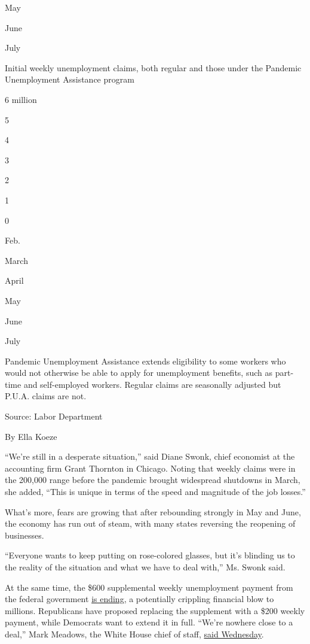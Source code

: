 May

June

July

Initial weekly unemployment claims, both regular and those under the
Pandemic Unemployment Assistance program

6 million

5

4

3

2

1

0

Feb.

March

April

May

June

July

Pandemic Unemployment Assistance extends eligibility to some workers who
would not otherwise be able to apply for unemployment benefits, such as
part-time and self-employed workers. Regular claims are seasonally
adjusted but P.U.A. claims are not.

Source: Labor Department

By Ella Koeze

``We're still in a desperate situation,'' said Diane Swonk, chief
economist at the accounting firm Grant Thornton in Chicago. Noting that
weekly claims were in the 200,000 range before the pandemic brought
widespread shutdowns in March, she added, ``This is unique in terms of
the speed and magnitude of the job losses.''

What's more, fears are growing that after rebounding strongly in May and
June, the economy has run out of steam, with many states reversing the
reopening of businesses.

``Everyone wants to keep putting on rose-colored glasses, but it's
blinding us to the reality of the situation and what we have to deal
with,'' Ms. Swonk said.

At the same time, the \$600 supplemental weekly unemployment payment
from the federal government
\href{https://www.nytimes.com/2020/07/29/business/economy/unemployment-benefits-coronavirus.html}{is
ending}, a potentially crippling financial blow to millions. Republicans
have proposed replacing the supplement with a \$200 weekly payment,
while Democrats want to extend it in full. ``We're nowhere close to a
deal,'' Mark Meadows, the White House chief of staff,
\href{https://www.nytimes.com/2020/07/29/business/economy/virus-aid-trump.html}{said
Wednesday}.

